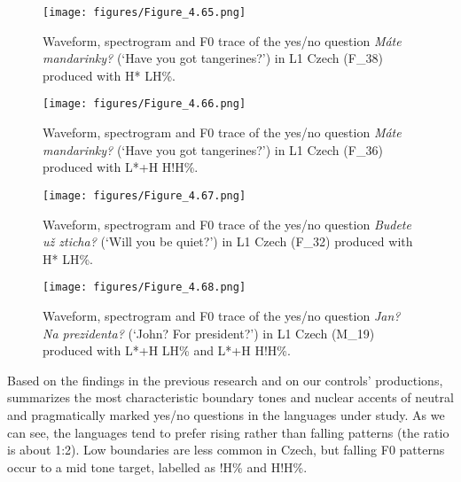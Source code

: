 \vfill
\begin{figure}[H]
\texttt{[image: figures/Figure\_4.65.png]}
\caption{Waveform, spectrogram and F0 trace of the yes/no question \textit{Máte mandarinky?} (‘Have you got tangerines?’) in L1 Czech (F\_38) produced with H* LH\%.}
\label{fig:4.65}
\end{figure}
\vfill\pagebreak

\begin{figure}[H]
\texttt{[image: figures/Figure\_4.66.png]}
\caption{Waveform, spectrogram and F0 trace of the yes/no question \textit{Máte mandarinky?} (‘Have you got tangerines?’) in L1 Czech (F\_36) produced with L*+H H!H\%.}
\label{fig:4.66}
\end{figure}

\begin{figure}[H]
\texttt{[image: figures/Figure\_4.67.png]}
\caption{Waveform, spectrogram and F0 trace of the yes/no question \textit{Budete už zticha?} (‘Will you be quiet?’)  in L1 Czech (F\_32) produced with H* LH\%.}
\label{fig:4.67}
\end{figure}

\begin{figure}[H]
\texttt{[image: figures/Figure\_4.68.png]}
\caption{Waveform, spectrogram and F0 trace of the yes/no question \textit{Jan? Na prezidenta?} (‘John? For president?’) in L1 Czech (M\_19) produced with L*+H LH\% and L*+H H!H\%.}
\label{fig:4.68}
\end{figure}

Based on the findings in the previous research and on our controls’ productions,  summarizes the most characteristic boundary tones and nuclear accents of neutral and pragmatically marked yes/no questions in the languages under study. As we can see, the languages tend to prefer rising rather than falling patterns (the ratio is about 1:2). Low boundaries are less common in Czech, but falling F0 patterns occur to a mid tone target, labelled as !H\% and H!H\%.

